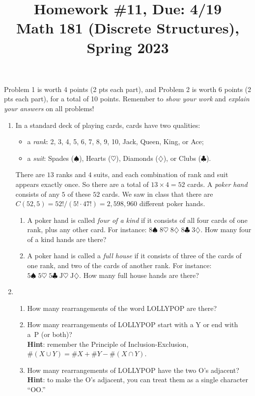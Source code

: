 \documentclass[11pt]{article}
\title{Homework \#11, Due: 4/19 \\Math 181 (Discrete Structures), Spring 2023}
\date{}
\begin{document}
\maketitle

\thispagestyle{empty}

\vspace{-1cm}

Problem 1 is worth 4 points (2 pts each part), and Problem 2 is worth 6 points (2 pts each part), for a total of 10 points. Remember to \emph{show your work} and \emph{explain your answers} on all problems!

\begin{enumerate}

\item In a standard deck of playing cards, cards have two qualities:
\begin{itemize}
\item a \emph{rank}: 2, 3, 4, 5, 6, 7, 8, 9, 10, Jack, Queen, King, or Ace;
\item a \emph{suit}: Spades ($\spadesuit$), Hearts ($\heartsuit$), Diamonds ($\diamondsuit$), or Clubs ($\clubsuit$).
\end{itemize}
There are $13$ ranks and $4$ suits, and each combination of rank and suit appears exactly once. So there are a total of $13 \times 4 = 52$ cards. A \emph{poker hand} consists of any $5$ of these $52$ cards. We saw in class that there are $C(52,5) = 52!/(5! \cdot 47!)=2,598,960$ different poker hands.
\begin{enumerate}
\item A poker hand is called \emph{four of a kind} if it consists of all four cards of one rank, plus any other card. For instance: $8\spadesuit \; 8\heartsuit \; 8\diamondsuit \; 8\clubsuit \; 3\diamondsuit$. How many four of a kind hands are there?
\item A poker hand is called a \emph{full house} if it consists of three of the cards of one rank, and two of the cards of another rank. For instance: $5\spadesuit \; 5\heartsuit \; 5\clubsuit \; \mathrm{J}\heartsuit \; \mathrm{J}\diamondsuit$. How many full house hands are there?
\end{enumerate}

\item \begin{enumerate}
\item How many rearrangements of the word LOLLYPOP are there?
\item How many rearrangements of LOLLYPOP start with a Y or end with a~P (or both)? \\ {\bf Hint}: remember the Principle of Inclusion-Exclusion, $\#(X\cup Y) = \#X + \#Y - \#(X\cap Y)$.
\item How many rearrangements of LOLLYPOP have the two O's adjacent? \\ {\bf Hint}: to make the O's adjacent, you can treat them as a single character ``OO.''
\end{enumerate}

\end{enumerate}
\end{document}
